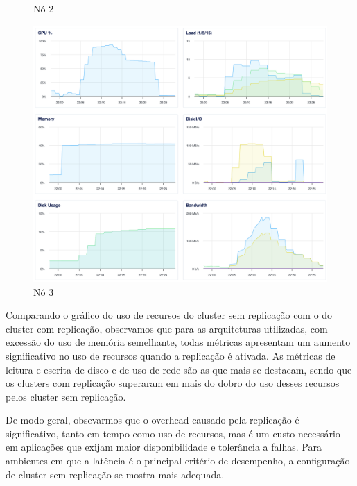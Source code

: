 \begin{figure}[H]
\begin{minipage}{0.32\linewidth}
    \caption{Nó 2}
  \end{minipage}
  \hfill
  \begin{minipage}{0.32\linewidth}
    \centering
    \includegraphics[width=\linewidth]{imgs/3-3-03.png}
    \caption{Nó 3}
  \end{minipage}
\end{figure}

Comparando o gráfico do uso de recursos do cluster sem replicação com o do cluster com replicação, observamos que para as arquiteturas utilizadas,
com excessão do uso de memória semelhante, todas métricas apresentam um aumento significativo no uso de recursos quando a replicação é ativada.
As métricas de leitura e escrita de disco e de uso de rede são as que mais se destacam, sendo que os clusters com replicação superaram em mais do dobro do uso desses recursos pelos cluster sem replicação.

De modo geral, obsevarmos que o overhead causado pela replicação é significativo, tanto em tempo como uso de recursos, 
mas é um custo necessário em aplicações que exijam maior disponibilidade e tolerância a falhas.
Para ambientes em que a latência é o principal critério de desempenho, a configuração de cluster sem replicação se mostra mais adequada.
